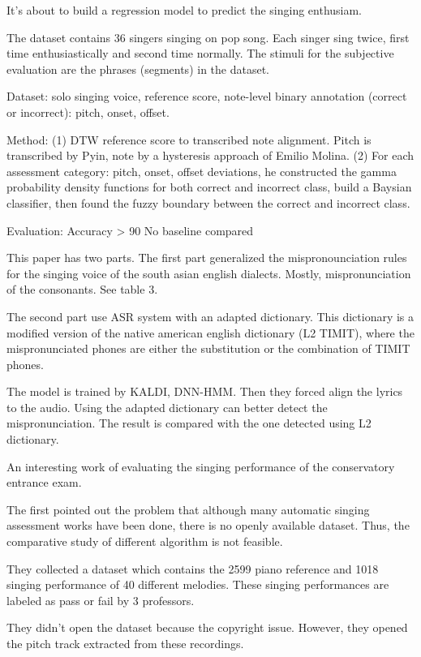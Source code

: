  It's about to build a regression model to predict the singing enthusiam.

The dataset contains 36 singers singing on pop song. Each singer sing twice, first time enthusiastically and second time normally. The stimuli for the subjective evaluation are the phrases (segments) in the dataset.

 Dataset: solo singing voice, reference score, note-level binary annotation (correct or incorrect): pitch, onset, offset.

Method:
(1) DTW reference score to transcribed note alignment. Pitch is transcribed by Pyin, note by a hysteresis approach of Emilio Molina.
(2) For each assessment category: pitch, onset, offset deviations, he constructed the gamma probability density functions for both correct and incorrect class, build a Baysian classifier, then found the fuzzy boundary between the correct and incorrect class.

Evaluation:
Accuracy > 90%
No baseline compared

 This paper has two parts. The first part generalized the mispronounciation rules for the singing voice of the south asian english dialects. Mostly, mispronunciation of the consonants. See table 3.

The second part use ASR system with an adapted dictionary. This dictionary is a modified version of the native american english dictionary (L2 TIMIT), where the mispronunciated phones are either the substitution or the combination of TIMIT phones.

The model is trained by KALDI, DNN-HMM. Then they forced align the lyrics to the audio. Using the adapted dictionary can better detect the mispronunciation. The result is compared with the one detected using L2 dictionary.

 An interesting work of evaluating the singing performance of the conservatory entrance exam.

The first pointed out the problem that although many automatic singing assessment works have been done, there is no openly available dataset. Thus, the comparative study of different algorithm is not feasible.

They collected a dataset which contains the 2599 piano reference and 1018 singing performance of 40 different melodies. These singing performances are labeled as pass or fail by 3 professors.

They didn't open the dataset because the copyright issue. However, they opened the pitch track extracted from these recordings.


